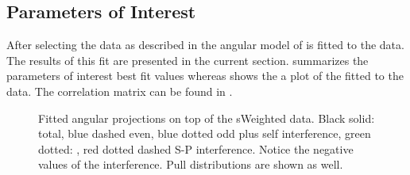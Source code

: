 \subsection{Parameters of Interest}
\label{Parameters_of_Interest}

After selecting the data as described in  the angular model of  is fitted to the data.
The results of this fit are presented in the current section.  summarizes the parameters
of interest best fit values whereas  shows the a plot of the fitted \pdf to the \BsJpsiKst data. The correlation matrix
can be found in .


\begin{figure}[h]
\begin{center}
  \begin{subfigure}{0.5\textwidth}
    \scalebox{1.3}{}
    \caption{}
    \label{angPlot_ctk}
  \end{subfigure}%
  \hfill%
  \begin{subfigure}{0.5\textwidth}
    \scalebox{1.3}{}
    \caption{}
    \label{angPlot_ctl}
  \end{subfigure}
  \begin{subfigure}{0.5\textwidth}
    \scalebox{1.3}{}
    \caption{}
    \label{angPlot_phi}
  \end{subfigure}
  \caption{Fitted angular \pdf projections on top of the \BsJpsiKst sWeighted data. 
           Black solid: total, blue dashed \pwave even, blue dotted \pwave odd plus \pwave self interference, 
           green dotted: \swave, red dotted dashed S-P interference. Notice the negative values of the \spwave interference.
           Pull distributions are shown as well.}
  \label{angular_plot}
\end{center}
\end{figure}


